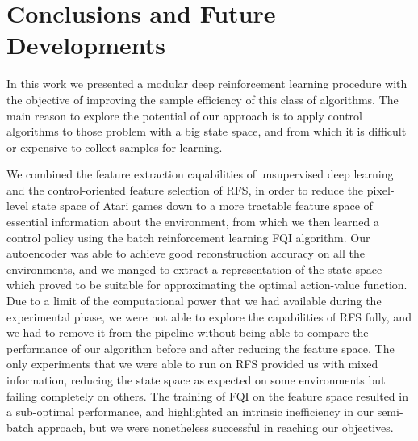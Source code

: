 \chapter{Conclusions and Future Developments}
\label{chapter7_conclusions}
\thispagestyle{empty}

\vspace{0.5cm}

In this work we presented a modular deep reinforcement learning procedure 
with the objective of improving the sample efficiency of this class of 
algorithms.
The main reason to explore the potential of our approach is to apply control
algorithms to those problem with a big state space, and from which it is 
difficult or expensive to collect samples for learning. 

We combined the feature extraction capabilities of unsupervised deep learning 
and the control-oriented feature selection of RFS, in order to reduce the 
pixel-level state space of Atari games down to a more tractable feature space of 
essential information about the environment, from which we then learned a 
control policy using the batch reinforcement learning FQI algorithm.
Our autoencoder was able to achieve good reconstruction accuracy on all the
environments, and we manged to extract a representation of the state space
which proved to be suitable for approximating the optimal action-value function.
Due to a limit of the computational power that we had available during the 
experimental phase, we were not able to explore the capabilities of RFS fully, 
and we had to remove it from the pipeline without being able to compare the 
performance of our algorithm before and after reducing the feature space. 
The only experiments that we were able to run on RFS provided us with mixed
information, reducing the state space as expected on some environments but 
failing completely on others. 
The training of FQI on the feature space resulted in a sub-optimal
performance, and highlighted an intrinsic inefficiency in our semi-batch 
approach, but we were nonetheless successful in reaching our objectives.

